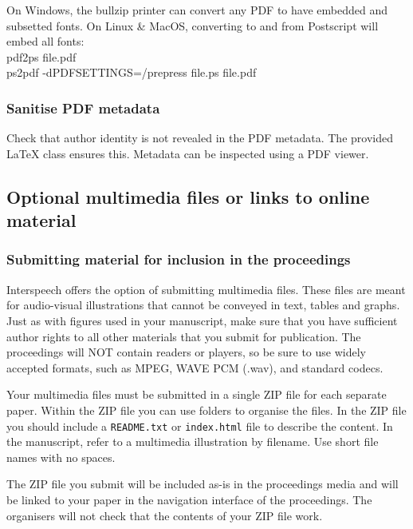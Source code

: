 \documentclass{Interspeech2024}
\begin{document}
On Windows, the bullzip printer can convert any PDF to have embedded and subsetted fonts. On Linux \& MacOS, converting to and from Postscript will embed all fonts:
\\

\noindent\textsf{pdf2ps file.pdf}\\
\noindent\textsf{ps2pdf -dPDFSETTINGS=/prepress file.ps file.pdf}


\subsubsection{Sanitise PDF metadata}
\label{section:pdf_sanitise}

Check that author identity is not revealed in the PDF metadata. The provided \LaTeX\xspace class ensures this. Metadata can be inspected using a PDF viewer. 

\subsection{Optional multimedia files or links to online material}
\label{section:multimedia}

\subsubsection{Submitting material for inclusion in the proceedings}

Interspeech offers the option of submitting multimedia files. These files are meant for audio-visual illustrations that cannot be conveyed in text, tables and graphs. Just as with figures used in your manuscript, make sure that you have sufficient author rights to all other materials that you submit for publication. The proceedings will NOT contain readers or players, so be sure to use widely accepted formats, such as MPEG, WAVE PCM (.wav), and standard codecs.

Your multimedia files must be submitted in a single ZIP file for each separate paper. Within the ZIP file you can use folders to organise the files. In the ZIP file you should include a \texttt{README.txt} or \texttt{index.html} file to describe the content. In the manuscript, refer to a multimedia illustration by filename. Use short file names with no spaces.

The ZIP file you submit will be included as-is in the proceedings media and will be linked to your paper in the navigation interface of the proceedings. The organisers will not check that the contents of your ZIP file work.
\end{document}
